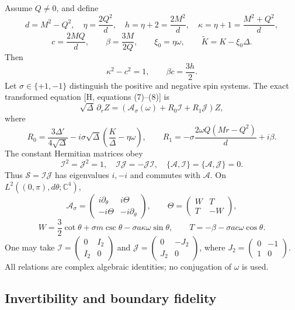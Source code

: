\documentclass[
  10pt,
  a4paper,
]{article}
\begin{document}
Assume \(Q\ne0\), and define \[
 d=M^2-Q^2,\quad \eta=\frac{2Q^2}{d},\quad
 h=\eta+2=\frac{2M^2}{d},\quad
 \kappa=\eta+1=\frac{M^2+Q^2}{d},
\] \[
 c=\frac{2MQ}{d},\qquad \beta=\frac{3M}{2Q},\qquad
 \xi_0=\eta\omega,\qquad \widetilde K=K-\xi_0\Delta .
\] Then \[
 \kappa^2-c^2=1,\qquad \beta c=\frac{3h}{2}.
 \tag{1}
\] Let \(\sigma\in\{+1,-1\}\) distinguish the positive and negative spin
systems. The exact transformed equation {[}H, equations (7)--(8){]} is
\[
 \sqrt\Delta\,\partial_r Z
 =(\mathcal A_\sigma(\omega)+R_0\mathcal I+R_1\mathcal J)Z,
 \tag{2}
\] where \[
 R_0=\frac{3\Delta'}{4\sqrt\Delta}
       -i\sigma\sqrt\Delta\left(\frac K\Delta-\eta\omega\right),\qquad
 R_1=-\sigma\frac{2\omega Q(Mr-Q^2)}d+i\beta.
 \tag{3}
\] The constant Hermitian matrices obey \[
 \mathcal I^2=\mathcal J^2=1,\quad
 \mathcal I\mathcal J=-\mathcal J\mathcal I,\quad
 \{\mathcal A,\mathcal I\}=\{\mathcal A,\mathcal J\}=0.
 \tag{4}
\] Thus \(\mathcal S=\mathcal I\mathcal J\) has eigenvalues \(i,-i\) and
commutes with \(\mathcal A\). On \(L^2((0,\pi),d\theta;\mathbb C^4)\),
\[
 \mathcal A_\sigma=
 \begin{pmatrix}i\partial_\theta&i\Theta\\-i\Theta&-i\partial_\theta\end{pmatrix},
 \qquad \Theta=\begin{pmatrix}W&T\\T&-W\end{pmatrix},
 \tag{5}
\] \[
 W=\frac32\cot\theta+\sigma m\csc\theta-\sigma a\kappa\omega\sin\theta,
 \qquad T=-\beta-\sigma ac\omega\cos\theta.
\] One may take
\(\mathcal I=\left(\begin{smallmatrix}0&I_2\\I_2&0\end{smallmatrix}\right)\)
and
\(\mathcal J=\left(\begin{smallmatrix}0&-J_2\\J_2&0\end{smallmatrix}\right)\),
where
\(J_2=\left(\begin{smallmatrix}0&-1\\1&0\end{smallmatrix}\right)\). All
relations are complex algebraic identities; no conjugation of \(\omega\)
is used.

\subsection{Invertibility and boundary
fidelity}\label{invertibility-and-boundary-fidelity}
\end{document}
